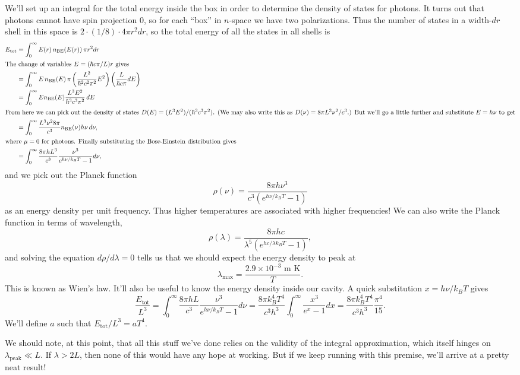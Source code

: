 \documentclass[../p052main.tex]{subfiles}
\begin{document}
We'll set up an integral for the total energy inside the box in order to determine the density of states for photons.
It turns out that photons cannot have spin projection 0, so for each ``box'' in $n$-space we have two polarizations.
Thus the number of states in a width-$dr$ shell in this space is $2 \cdot (1/8) \cdot 4\pi r^2dr$, so the total energy of all the states in all shells is
\begin{align*}
    E_\textrm{tot} &= \int_{0}^{\infty} E(r) \,n_\textrm{BE}(E(r)) \,\pi r^2 dr \\
    \intertext{The change of variables $E = (\hbar c\pi / L)r$ gives}
    &= \int_{0}^{\infty} E \,n_\textrm{BE}(E) \,\pi \left( \frac{L^2}{\hbar^2 c^2 \pi^2} E^2 \right) \left( \frac{L}{\hbar c \pi} dE \right) \\
    &= \int_{0}^{\infty} E n_\textrm{BE}(E) \frac{L^3 E^2}{\hbar^3 c^3 \pi^2} \,dE \\
    \intertext{From here we can pick out the density of states $D(E) = (L^3 E^2) / (\hbar^3 c^3 \pi^2)$. (We may also write this as $D(\nu) = 8\pi L^3 \nu^2 / c^3$.) But we'll go a little further and substitute $E = h\nu$ to get}
    &= \int_{0}^{\infty} \frac{L^3 \nu^2 8\pi}{c^3} n_\textrm{BE}(\nu) h\nu \,d\nu, \\
    \intertext{where $\mu = 0$ for photons. Finally substituting the Bose-Einstein distribution gives}
    &= \int_{0}^{\infty} \frac{8\pi hL^3}{c^3} \frac{\nu^3}{e^{h\nu / k_B T} - 1} d\nu,
\end{align*}
and we pick out the Planck function
\[ \rho(\nu) = \frac{8\pi h\nu^3}{c^3 \left( e^{h\nu / k_B T} - 1 \right)} \]
as an energy density per unit frequency.
Thus higher temperatures are associated with higher frequencies!
We can also write the Planck function in terms of wavelength,
\[ \rho(\lambda) = \frac{8\pi hc}{\lambda^{5} \left( e^{hc / \lambda k_BT} - 1 \right)}, \]
and solving the equation $d\rho / d\lambda = 0$ tells us that we should expect the energy density to peak at
\[ \lambda_\textrm{max} = \frac{2.9 \times 10^{-3} \textrm{ m K}}{T}. \]
This is known as Wien's law.
It'll also be useful to know the energy density inside our cavity.
A quick substitution $x = h\nu / k_BT$ gives
\[ \frac{E_\textrm{tot}}{L^3} = \int_{0}^{\infty} \frac{8\pi hL}{c^3} \frac{\nu^3}{e^{h\nu / k_B T} - 1} d\nu = \frac{8\pi k_B^{4}T^{4}}{c^3h^3} \int_{0}^{\infty} \frac{x^3}{e^{x} - 1}dx = \frac{8\pi k_B^{4}T^{4}}{c^3h^3} \frac{\pi^{4}}{15}. \]
We'll define $a$ such that $E_\textrm{tot} / L^3 = aT^{4}$.

We should note, at this point, that all this stuff we've done relies on the validity of the integral approximation, which itself hinges on $\lambda_\textrm{peak} \ll L$.
If $\lambda > 2L$, then none of this would have any hope at working.
But if we keep running with this premise, we'll arrive at a pretty neat result!
\end{document}
